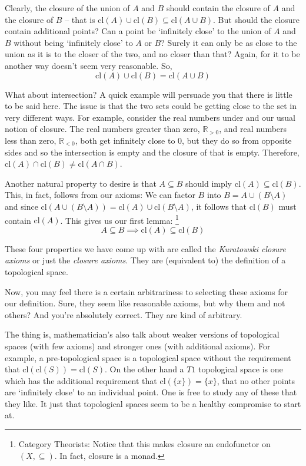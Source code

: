 \documentclass{report}
\newcommand{\cl}{\mathrm{cl}}
\begin{document}
Clearly, the closure of the union of $A$ and $B$ should contain the closure of $A$ and the closure of $B$ -- that is $\cl(A)∪\cl(B) ⊆ \cl(A∪B)$. But should the closure contain additional points? Can a point be `infinitely close' to the union of $A$ and $B$ without being `infinitely close' to $A$ or $B$? Surely it can only be as close to the union as it is to the closer of the two, and no closer than that? Again, for it to be another way doesn't seem very reasonable. So, 
\begin{equation}
\cl(A)∪\cl(B) = \cl(A∪B) \tag{Closure 4}
\end{equation}

What about intersection? A quick example will persuade you that there is little to be said here. The issue is that the two sets could be getting close to the set in very different ways. For example, consider the real numbers under and our usual notion of closure. The real numbers greater than zero, $ℝ_{>0}$, and real numbers less than zero, $ℝ_{<0}$, both get infinitely close to $0$, but they do so from opposite sides and so the intersection is empty and the closure of that is empty. Therefore, $\cl(A)∩\cl(B) ≠ \cl(A∩B)$.

Another natural property to desire is that $A ⊆ B$ should imply $\cl(A) ⊆ \cl(B)$. This, in fact, follows from our axioms: We can factor $B$ into $B = A∪(B\setminus A)$ and since $\cl(A∪(B\setminus A)) = \cl(A)∪\cl(B\setminus A)$, it follows that $\cl(B)$ must contain $\cl(A)$. This gives us our first lemma:
\footnote{Category Theorists: Notice that this makes closure an endofunctor on $(X, ⊆)$. In fact, closure is a monad.}
\begin{equation}
A ⊆ B   \implies   \cl(A) ⊆ \cl(B)   \tag{Lemma 1}
\end{equation}
  

These four properties we have come up with are called the \emph{Kuratowski closure axioms} or just the \emph{closure axioms}. They are (equivalent to) the definition of a topological space.

Now, you may feel there is a certain arbitrariness to selecting these axioms for our definition. Sure, they seem like reasonable axioms, but why them and not others? And you're absolutely correct. They are kind of arbitrary.

The thing is, mathematician's also talk about weaker versions of topological spaces (with few axioms) and stronger ones (with additional axioms). For example, a pre-topological space is a topological space without the requirement that $\cl(\cl(S)) = \cl(S)$. On the other hand a $T1$ topological space is one which has the additional requirement that $\cl(\{x\}) = \{x\}$, that no other points are `infinitely close' to an individual point. One is free to study any of these that they like. It just that topological spaces seem to be a healthy compromise to start at.
\end{document}
